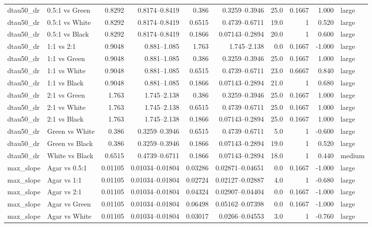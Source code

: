 \begin{longtable}{ll rr rr rrr l}
dtau50_dr & 0.5:1 vs Green & 0.8292 & 0.8174–0.8419 & 0.386 & 0.3259–0.3946 & 25.0 & 0.1667 & 1.000 & large \\
dtau50_dr & 0.5:1 vs White & 0.8292 & 0.8174–0.8419 & 0.6515 & 0.4739–0.6711 & 19.0 & 1 & 0.520 & large \\
dtau50_dr & 0.5:1 vs Black & 0.8292 & 0.8174–0.8419 & 0.1866 & 0.07143–0.2894 & 20.0 & 1 & 0.600 & large \\
dtau50_dr & 1:1 vs 2:1 & 0.9048 & 0.881–1.085 & 1.763 & 1.745–2.138 & 0.0 & 0.1667 & -1.000 & large \\
dtau50_dr & 1:1 vs Green & 0.9048 & 0.881–1.085 & 0.386 & 0.3259–0.3946 & 25.0 & 0.1667 & 1.000 & large \\
dtau50_dr & 1:1 vs White & 0.9048 & 0.881–1.085 & 0.6515 & 0.4739–0.6711 & 23.0 & 0.6667 & 0.840 & large \\
dtau50_dr & 1:1 vs Black & 0.9048 & 0.881–1.085 & 0.1866 & 0.07143–0.2894 & 21.0 & 1 & 0.680 & large \\
dtau50_dr & 2:1 vs Green & 1.763 & 1.745–2.138 & 0.386 & 0.3259–0.3946 & 25.0 & 0.1667 & 1.000 & large \\
dtau50_dr & 2:1 vs White & 1.763 & 1.745–2.138 & 0.6515 & 0.4739–0.6711 & 25.0 & 0.1667 & 1.000 & large \\
dtau50_dr & 2:1 vs Black & 1.763 & 1.745–2.138 & 0.1866 & 0.07143–0.2894 & 25.0 & 0.1667 & 1.000 & large \\
dtau50_dr & Green vs White & 0.386 & 0.3259–0.3946 & 0.6515 & 0.4739–0.6711 & 5.0 & 1 & -0.600 & large \\
dtau50_dr & Green vs Black & 0.386 & 0.3259–0.3946 & 0.1866 & 0.07143–0.2894 & 19.0 & 1 & 0.520 & large \\
dtau50_dr & White vs Black & 0.6515 & 0.4739–0.6711 & 0.1866 & 0.07143–0.2894 & 18.0 & 1 & 0.440 & medium \\
max_slope & Agar vs 0.5:1 & 0.01105 & 0.01034–0.01804 & 0.03286 & 0.02871–0.04651 & 0.0 & 0.1667 & -1.000 & large \\
max_slope & Agar vs 1:1 & 0.01105 & 0.01034–0.01804 & 0.02724 & 0.02127–0.02887 & 4.0 & 1 & -0.680 & large \\
max_slope & Agar vs 2:1 & 0.01105 & 0.01034–0.01804 & 0.04324 & 0.02907–0.04404 & 0.0 & 0.1667 & -1.000 & large \\
max_slope & Agar vs Green & 0.01105 & 0.01034–0.01804 & 0.06498 & 0.05162–0.07398 & 0.0 & 0.1667 & -1.000 & large \\
max_slope & Agar vs White & 0.01105 & 0.01034–0.01804 & 0.03017 & 0.0266–0.04553 & 3.0 & 1 & -0.760 & large \\

\end{longtable}
